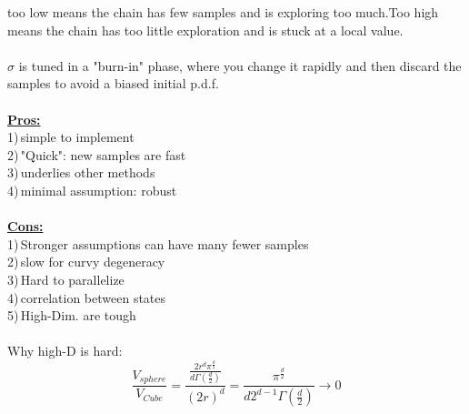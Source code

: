 \documentclass{article}
\begin{document}
too low means the chain has few samples and is exploring too much.Too high means the chain has too little exploration and is stuck at a local value.\\
\\
\( \sigma \) is tuned in a "burn-in" phase, where you change it rapidly and then discard the samples to avoid a biased initial p.d.f.\\
\\
\textbf{\underline{Pros:}}\\
1)\,simple to implement\\
2)\,"Quick": new samples are fast\\
3)\,underlies other methods\\
4)\,minimal assumption: robust\\
\\
\textbf{\underline{Cons:}}\\
1)\,Stronger assumptions can have many fewer samples\\
2)\,slow for curvy degeneracy\\
3)\,Hard to parallelize\\
4)\,correlation between states\\
5)\,High-Dim. are tough\\
\\
Why high-D is hard:\\
\[ \frac{V_{sphere}}{V_{Cube}}=\frac{\frac{2r^d\pi^{\frac{d}{2}}}{d \Gamma(\frac{d}{2})}}{(2r)^d}=\frac{\pi^{\frac{d}{2}}}{d2^{d-1}\Gamma(\frac{d}{2})}\rightarrow 0\]
\end{document}

